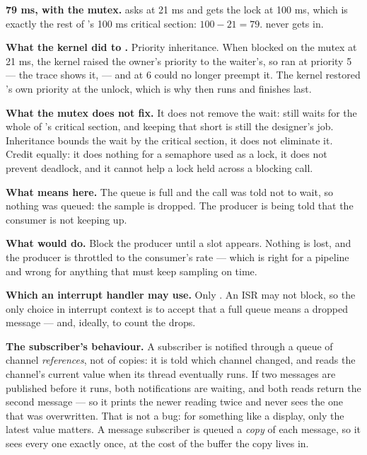 \textbf{79 ms, with the mutex.}  asks at 21 ms and gets the lock at 100 ms, which is
exactly the rest of 's 100 ms critical section: $100 - 21 = 79$.  never gets
in. 

\textbf{What the kernel did to .} Priority inheritance. When  blocked on the
mutex at 21 ms, the kernel raised the owner's priority to the waiter's, so  ran at
priority 5 --- the trace shows it,  --- and  at 6 could no
longer preempt it. The kernel restored 's own priority at the unlock, which is why
 then runs and  finishes last. 

\textbf{What the mutex does not fix.} It does not remove the wait:  still waits for the
whole of 's critical section, and keeping that short is still the designer's job.
Inheritance bounds the wait by the critical section, it does not eliminate it. Credit equally: it
does nothing for a semaphore used as a lock, it does not prevent deadlock, and it cannot help a lock
held across a blocking call. 

\textbf{What  means here.} The queue is full and the call was told not to wait, so
nothing was queued: the sample is dropped. The producer is being told that the consumer is not
keeping up. 

\textbf{What  would do.} Block the producer until a slot appears. Nothing is lost,
and the producer is throttled to the consumer's rate --- which is right for a pipeline and wrong for
anything that must keep sampling on time. 

\textbf{Which an interrupt handler may use.} Only . An ISR may not block, so the
only choice in interrupt context is to accept that a full queue means a dropped message --- and,
ideally, to count the drops. 

\textbf{The subscriber's behaviour.} A subscriber is notified through a queue of channel
\emph{references}, not of copies: it is told which channel changed, and reads the channel's current
value when its thread eventually runs. If two messages are published before it runs, both
notifications are waiting, and both reads return the second message --- so it prints the newer
reading twice and never sees the one that was overwritten. That is not a bug: for something like a
display, only the latest value matters. A message subscriber is queued a \emph{copy} of each
message, so it sees every one exactly once, at the cost of the buffer the copy lives in.

